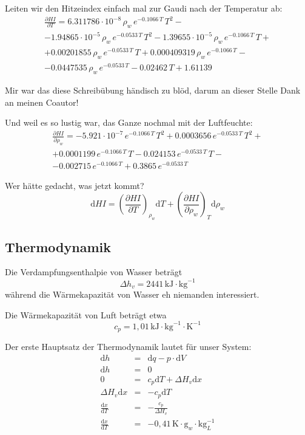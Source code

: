 \documentclass{article}
\begin{document}
Leiten wir den Hitzeindex einfach mal zur Gaudi nach der Temperatur ab:
\begin{multline}
    \frac{\partial HI}{\partial T} = 6.311786 \cdot 10^{-8}\, \rho_w\, e^{-0.1066\, T}\, T^2 - \\ - 1.94865 \cdot 10^{-5}\, \rho_w\, e^{-0.0533\, T}\, T^2 - 1.39655 \cdot 10^{-5}\, \rho_w\, e^{-0.1066\, T}\, T + \\  + 0.00201855\, \rho_w\, e^{-0.0533\, T}\, T + 0.000409319\, \rho_w\, e^{-0.1066\, T} - \\ - 0.0447535\, \rho_w\, e^{-0.0533\, T} - 0.02462\, T + 1.61139
\end{multline}

Mir war das diese Schreibübung händisch zu blöd, darum an dieser Stelle Dank an meinen Coautor!

Und weil es so lustig war, das Ganze nochmal mit der Luftfeuchte:
\begin{multline}
    \frac{\partial HI}{\partial \rho_w} = -5.921 \cdot 10^{-7}\, e^{-0.1066\, T}\, T^2 + 0.0003656\, e^{-0.0533\, T}\, T^2 + \\ + 0.0001199\, e^{-0.1066\, T}\, T - 0.024153\, e^{-0.0533\, T}\, T - \\ - 0.002715\, e^{-0.1066\, T} + 0.3865\, e^{-0.0533\, T}
\end{multline}

Wer hätte gedacht, was jetzt kommt?
\begin{equation}
    \mathrm{d} HI = \left( \frac{\partial HI}{\partial T} \right)_{\rho_w} \mathrm d T + \left( \frac{\partial HI}{\partial \rho_w} \right)_T \mathrm d \rho_w
\end{equation}

\subsection{Thermodynamik}
Die Verdampfungsenthalpie von Wasser beträgt
\begin{equation}
    \Delta h_v = 2441 \, \mathrm{kJ} \cdot \mathrm{kg}^{-1}
\end{equation}
während die Wärmekapazität von Wasser eh niemanden interessiert.

Die Wärmekapazität von Luft beträgt etwa
\begin{equation}
    c_p = 1,01 \, \mathrm{kJ} \cdot \mathrm{kg}^{-1} \cdot \mathrm{K}^{-1}
\end{equation}

Der erste Hauptsatz der Thermodynamik lautet für unser System:
\begin{eqnarray}
    \mathrm d h &=& \mathrm d q - p \cdot \mathrm d V \\
    \mathrm d h &=& 0 \\
    0 &=& c_p \mathrm d T + \Delta H_v \mathrm d x \\
    \Delta H_v \mathrm d x &=& - c_p \mathrm d T \\
    \frac{\mathrm d x}{\mathrm d T} &=& -\frac{c_p}{\Delta H_v} \\
    \frac{\mathrm d x}{\mathrm d T} &=& -0,41 \, \mathrm K \cdot \mathrm{g}_w \cdot \mathrm{kg}_L^{-1}
\end{eqnarray}
\end{document}

